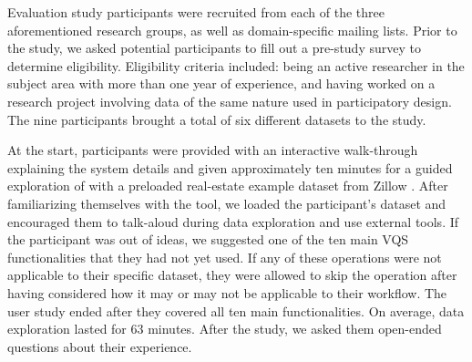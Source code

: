 \par Evaluation study participants were recruited from each of the three aforementioned research groups, as well as domain-specific mailing lists. Prior to the study, we asked potential participants to fill out a pre-study survey to determine eligibility. Eligibility criteria included: being an active researcher in the subject area with more than one year of experience, and having worked on a research project involving data of the same nature used in participatory design. The nine participants brought a total of six different datasets to the study. 
\par At the start, participants were provided with an interactive walk-through explaining the system details and given approximately ten minutes for a guided exploration of \zvpp with a preloaded real-estate example dataset from Zillow \cite{zillow}. After familiarizing themselves with the tool, we loaded the participant's dataset and encouraged them to talk-aloud during data exploration and use external tools. If the participant was out of ideas, we suggested one of the ten main VQS functionalities that they had not yet used. If any of these operations were not applicable to their specific dataset, they were allowed to skip the operation after having considered how it may or may not be applicable to their workflow. The user study ended after they covered all ten main functionalities. On average, data exploration lasted for 63 minutes. After the study, we asked them open-ended questions about their experience.%
